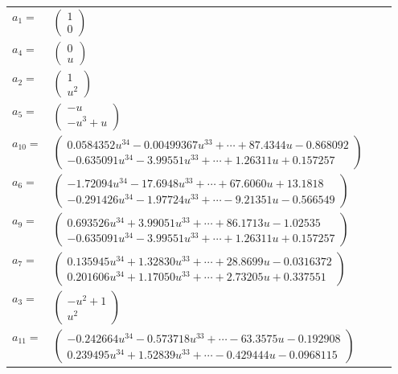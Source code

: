 \documentclass[1p]{elsarticle_modified}
\theoremstyle{definition}
\begin{document}
\begin{tabular}{m{7pt} m{180pt} m{7pt} m{180pt} }
\flushright $a_{1}=$&$\begin{pmatrix}1\\0\end{pmatrix}$ \\
\flushright $a_{4}=$&$\begin{pmatrix}0\\u\end{pmatrix}$ \\
\flushright $a_{2}=$&$\begin{pmatrix}1\\u^2\end{pmatrix}$ \\
\flushright $a_{5}=$&$\begin{pmatrix}- u\\- u^3+u\end{pmatrix}$ \\
\flushright $a_{10}=$&$\begin{pmatrix}0.0584352 u^{34}-0.00499367 u^{33}+\cdots+87.4344 u-0.868092\\-0.635091 u^{34}-3.99551 u^{33}+\cdots+1.26311 u+0.157257\end{pmatrix}$ \\
\flushright $a_{6}=$&$\begin{pmatrix}-1.72094 u^{34}-17.6948 u^{33}+\cdots+67.6060 u+13.1818\\-0.291426 u^{34}-1.97724 u^{33}+\cdots-9.21351 u-0.566549\end{pmatrix}$ \\
\flushright $a_{9}=$&$\begin{pmatrix}0.693526 u^{34}+3.99051 u^{33}+\cdots+86.1713 u-1.02535\\-0.635091 u^{34}-3.99551 u^{33}+\cdots+1.26311 u+0.157257\end{pmatrix}$ \\
\flushright $a_{7}=$&$\begin{pmatrix}0.135945 u^{34}+1.32830 u^{33}+\cdots+28.8699 u-0.0316372\\0.201606 u^{34}+1.17050 u^{33}+\cdots+2.73205 u+0.337551\end{pmatrix}$ \\
\flushright $a_{3}=$&$\begin{pmatrix}- u^2+1\\u^2\end{pmatrix}$ \\
\flushright $a_{11}=$&$\begin{pmatrix}-0.242664 u^{34}-0.573718 u^{33}+\cdots-63.3575 u-0.192908\\0.239495 u^{34}+1.52839 u^{33}+\cdots-0.429444 u-0.0968115\end{pmatrix}$ \\

\end{tabular}
\end{document}
